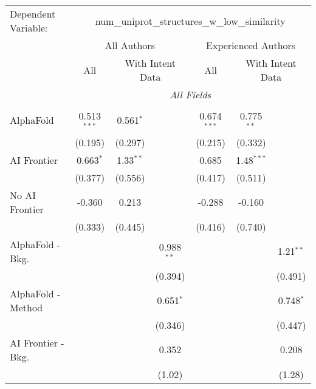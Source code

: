 \begingroup
\centering
\begin{tabular}{lcccccc}
   \tabularnewline \midrule \midrule
   Dependent Variable: & \multicolumn{6}{c}{num\_uniprot\_structures\_w\_low\_similarity}\\
 & \multicolumn{3}{c}{All Authors} & \multicolumn{3}{c}{Experienced Authors} \\
\cmidrule(lr){2-4} \cmidrule(lr){5-7}
 & \multicolumn{1}{c}{All} & \multicolumn{2}{c}{With Intent Data} & \multicolumn{1}{c}{All} & \multicolumn{2}{c}{With Intent Data} \\
\cmidrule(lr){2-2} \cmidrule(lr){3-4} \cmidrule(lr){5-5} \cmidrule(lr){6-7}
 & \multicolumn{6}{c}{\textit{All Fields}} \\ \\
   AlphaFold               & 0.513$^{***}$ & 0.561$^{*}$ &              & 0.674$^{***}$ & 0.775$^{**}$ &   \\   
                           & (0.195)       & (0.297)     &              & (0.215)       & (0.332)      &   \\   
   AI Frontier             & 0.663$^{*}$   & 1.33$^{**}$ &              & 0.685         & 1.48$^{***}$ &   \\   
                           & (0.377)       & (0.556)     &              & (0.417)       & (0.511)      &   \\   
   No AI Frontier          & -0.360        & 0.213       &              & -0.288        & -0.160       &   \\   
                           & (0.333)       & (0.445)     &              & (0.416)       & (0.740)      &   \\   
   AlphaFold - Bkg.        &               &             & 0.988$^{**}$ &               &              & 1.21$^{**}$\\   
                           &               &             & (0.394)      &               &              & (0.491)\\   
   AlphaFold - Method      &               &             & 0.651$^{*}$  &               &              & 0.748$^{*}$\\   
                           &               &             & (0.346)      &               &              & (0.447)\\   
   AI Frontier - Bkg.      &               &             & 0.352        &               &              & 0.208\\   
                           &               &             & (1.02)       &               &              & (1.28)\\   

\end{tabular}
